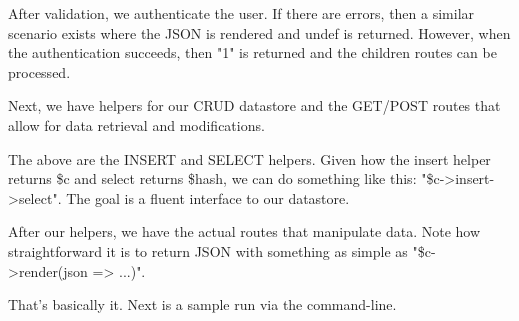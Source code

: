 \documentclass[14pt]{extreport}
\begin{document}


\clearpage

After validation, we authenticate the user.  If there are errors, then a
similar scenario exists where the JSON is rendered and undef is returned.
However, when the authentication succeeds, then "1" is returned and the 
children routes can be processed.



Next, we have helpers for our CRUD datastore and the GET/POST routes that allow
for data retrieval and modifications.

\clearpage



The above are the INSERT and SELECT helpers.  Given how the insert helper returns \$c and
select returns \$hash, we can do something like this: "\$c->insert->select".  The goal
is a fluent interface to our datastore.

After our helpers, we have the actual routes that manipulate data.  Note how straightforward
it is to return JSON with something as simple as "\$c->render(json => ...)".

\clearpage



That's basically it.  Next is a sample run via the command-line.

\clearpage
\end{document}
